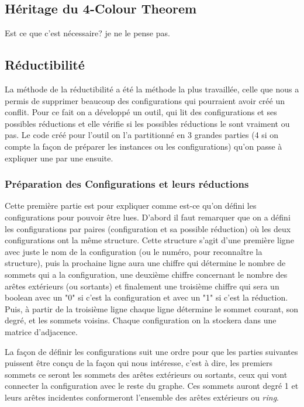 \documentclass[10pt,a4paper]{article}
\begin{document}
\subsection{Héritage du 4-Colour Theorem}

Est ce que c'est nécessaire? je ne le pense pas.

\subsection{Réductibilité}

La méthode de la réductibilité a été la méthode la plus travaillée, celle que nous a permis de supprimer beaucoup des configurations qui pourraient avoir créé un conflit. Pour ce fait on a développé un outil, qui lit des configurations et ses possibles réductions et elle vérifie si les possibles réductions le sont vraiment ou pas. Le code créé pour l'outil on l'a partitionné en 3 grandes parties (4 si on compte la façon de préparer les instances ou les configurations) qu'on passe à expliquer une par une ensuite.

\subsubsection{Préparation des Configurations et leurs réductions}

Cette première partie est pour expliquer comme est-ce qu'on défini les configurations pour pouvoir être lues. D'abord il  faut remarquer que on a défini les configurations par paires (configuration et sa possible réduction) où les deux configurations ont la même structure. Cette structure s'agit d'une première ligne avec juste le nom de la configuration (ou le numéro, pour reconnaître la structure), puis la prochaine ligne aura une chiffre qui détermine le nombre de sommets qui a la configuration, une deuxième chiffre concernant le nombre des arêtes extérieurs (ou sortants) et finalement une troisième chiffre qui sera un boolean avec un "0" si c'est la configuration et avec un "1" si c'est la réduction. Puis, à partir de la troisième ligne chaque ligne détermine le sommet courant, son degré, et les sommets voisins. Chaque configuration on la stockera dans une matrice d'adjacence.

La façon de définir les configurations suit une ordre pour que les parties suivantes puissent être conçu de la façon qui nous intéresse, c'est à dire, les premiers sommets ce seront les sommets des arêtes extérieurs ou sortants, ceux qui vont connecter la configuration avec le reste du graphe. Ces sommets auront degré 1 et leurs arêtes incidentes conformeront l'ensemble des arêtes extérieurs ou \emph{ring}.
\end{document}
